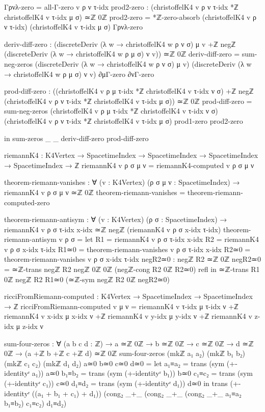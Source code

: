 \documentclass[11pt,a4paper]{book}
\begin{document}
\begin{code}
      Γρνλ-zero = all-Γ-zero v ρ ν τ-idx
      prod2-zero : (christoffelK4 v ρ ν τ-idx *ℤ christoffelK4 v τ-idx μ σ) ≃ℤ 0ℤ
      prod2-zero = *ℤ-zero-absorb (christoffelK4 v ρ ν τ-idx)
                                   (christoffelK4 v τ-idx μ σ) Γρνλ-zero
      
      deriv-diff-zero : (discreteDeriv (λ w → christoffelK4 w ρ ν σ) μ v +ℤ 
                         negℤ (discreteDeriv (λ w → christoffelK4 w ρ μ σ) ν v)) ≃ℤ 0ℤ
      deriv-diff-zero = sum-neg-zeros 
                          (discreteDeriv (λ w → christoffelK4 w ρ ν σ) μ v)
                          (discreteDeriv (λ w → christoffelK4 w ρ μ σ) ν v)
                          ∂μΓ-zero ∂νΓ-zero
      
      prod-diff-zero : ((christoffelK4 v ρ μ τ-idx *ℤ christoffelK4 v τ-idx ν σ) +ℤ
                        negℤ (christoffelK4 v ρ ν τ-idx *ℤ christoffelK4 v τ-idx μ σ)) ≃ℤ 0ℤ
      prod-diff-zero = sum-neg-zeros
                         (christoffelK4 v ρ μ τ-idx *ℤ christoffelK4 v τ-idx ν σ)
                         (christoffelK4 v ρ ν τ-idx *ℤ christoffelK4 v τ-idx μ σ)
                         prod1-zero prod2-zero
      
  in sum-zeros _ _ deriv-diff-zero prod-diff-zero

riemannK4 : K4Vertex → SpacetimeIndex → SpacetimeIndex → 
            SpacetimeIndex → SpacetimeIndex → ℤ
riemannK4 v ρ σ μ ν = riemannK4-computed v ρ σ μ ν

theorem-riemann-vanishes : ∀ (v : K4Vertex) (ρ σ μ ν : SpacetimeIndex) →
  riemannK4 v ρ σ μ ν ≃ℤ 0ℤ
theorem-riemann-vanishes = theorem-riemann-computed-zero

theorem-riemann-antisym : ∀ (v : K4Vertex) (ρ σ : SpacetimeIndex) →
                          riemannK4 v ρ σ τ-idx x-idx ≃ℤ negℤ (riemannK4 v ρ σ x-idx τ-idx)
theorem-riemann-antisym v ρ σ = 
  let R1 = riemannK4 v ρ σ τ-idx x-idx
      R2 = riemannK4 v ρ σ x-idx τ-idx
      R1≃0 = theorem-riemann-vanishes v ρ σ τ-idx x-idx
      R2≃0 = theorem-riemann-vanishes v ρ σ x-idx τ-idx
      negR2≃0 : negℤ R2 ≃ℤ 0ℤ
      negR2≃0 = ≃ℤ-trans {negℤ R2} {negℤ 0ℤ} {0ℤ} (negℤ-cong {R2} {0ℤ} R2≃0) refl
  in ≃ℤ-trans {R1} {0ℤ} {negℤ R2} R1≃0 (≃ℤ-sym {negℤ R2} {0ℤ} negR2≃0)

ricciFromRiemann-computed : K4Vertex → SpacetimeIndex → SpacetimeIndex → ℤ
ricciFromRiemann-computed v μ ν = 
  riemannK4 v τ-idx μ τ-idx ν +ℤ
  riemannK4 v x-idx μ x-idx ν +ℤ
  riemannK4 v y-idx μ y-idx ν +ℤ
  riemannK4 v z-idx μ z-idx ν

sum-four-zeros : ∀ (a b c d : ℤ) → a ≃ℤ 0ℤ → b ≃ℤ 0ℤ → c ≃ℤ 0ℤ → d ≃ℤ 0ℤ →
                 (a +ℤ b +ℤ c +ℤ d) ≃ℤ 0ℤ
sum-four-zeros (mkℤ a₁ a₂) (mkℤ b₁ b₂) (mkℤ c₁ c₂) (mkℤ d₁ d₂) a≃0 b≃0 c≃0 d≃0 =
  let a₁≡a₂ = trans (sym (+-identityʳ a₁)) a≃0
      b₁≡b₂ = trans (sym (+-identityʳ b₁)) b≃0
      c₁≡c₂ = trans (sym (+-identityʳ c₁)) c≃0
      d₁≡d₂ = trans (sym (+-identityʳ d₁)) d≃0
  in trans (+-identityʳ ((a₁ + b₁ + c₁) + d₁))
           (cong₂ _+_ (cong₂ _+_ (cong₂ _+_ a₁≡a₂ b₁≡b₂) c₁≡c₂) d₁≡d₂)


\end{code}
\end{document}
